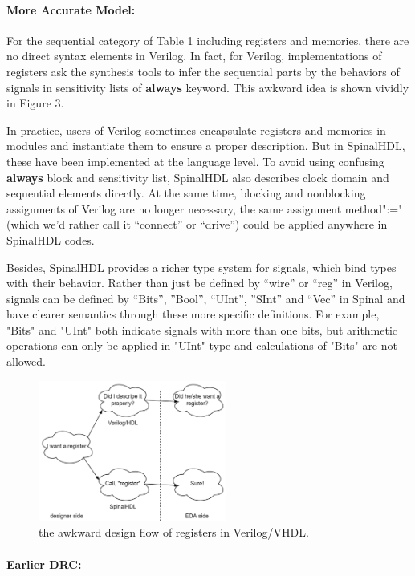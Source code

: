 \documentclass{article}
\begin{document}
\paragraph{\textbf{More Accurate Model:}}
For the sequential category of Table 1 including registers and memories, there are no direct syntax elements in Verilog. In fact, for Verilog, implementations of registers ask the synthesis tools to infer the sequential parts by the behaviors of signals in sensitivity lists of \textbf{always} keyword. This awkward idea is shown vividly in Figure 3.

In practice, users of Verilog sometimes encapsulate registers and memories in modules and instantiate them to ensure a proper description. But in SpinalHDL, these have been implemented at the language level. To avoid using confusing \textbf{always} block and sensitivity list, SpinalHDL also describes clock domain and sequential elements directly. At the same time, blocking and nonblocking assignments of Verilog are no longer necessary, the same assignment method":="(which we’d rather call it “connect” or “drive”) could be applied anywhere in SpinalHDL codes.

Besides, SpinalHDL provides a richer type system for signals, which bind types with their behavior. Rather than just be defined by “wire” or “reg” in Verilog, signals can be defined by “Bits”, ”Bool”, “UInt”, ”SInt” and “Vec” in Spinal and have clearer semantics through these more specific definitions. For example, "Bits" and "UInt" both indicate signals with more than one bits, but arithmetic operations can only be applied in "UInt" type and calculations of "Bits" are not allowed. 

\begin{figure}
\centering
\includegraphics[width=0.55\textwidth]{awkward.png}
\caption{\label{fig:awkward}the awkward design flow of registers in Verilog/VHDL.}
\end{figure}

\paragraph{\textbf{Earlier DRC:}}
\end{document}
